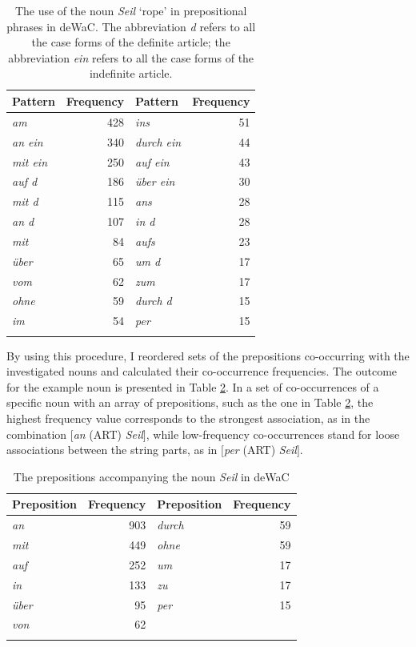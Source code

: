 \begin{table}
		\begin{tabular}{lr lr}
		\lsptoprule
		Pattern & Frequency &  Pattern & Frequency\\\midrule
			\textit{am} & 428 & \textit{ins} & 51\\
			\textit{an ein} & 340 & \textit{durch ein} & 44\\
			\textit{mit ein} & 250 & \textit{auf ein} & 43\\
			\textit{auf d} & 186 & \textit{über ein} & 30\\
			\textit{mit d} & 115 & \textit{ans} & 28\\
			\textit{an d} & 107 & \textit{in d} & 28\\
			\textit{mit} & 84 & \textit{aufs} & 23\\
			\textit{über} & 65 & \textit{um d} & 17\\
			\textit{vom} & 62 & \textit{zum} & 17\\
			\textit{ohne} & 59 & \textit{durch d} & 15\\
			\textit{im} & 54 & \textit{per} & 15\\
		\lspbottomrule
	\end{tabular}
	\caption{The use of the noun \textit{Seil} `rope' in prepositional phrases in deWaC. The abbreviation \textit{d} refers to all the case forms of the definite article; the abbreviation \textit{ein} refers to all the case forms of the indefinite article.\label{tab:5:2}}
\end{table}

By using this procedure, I reordered sets of the prepositions co-occurring with the investigated nouns and calculated their co-occurrence frequencies. The outcome for the example noun is presented in Table \ref{tab:5:3}. In a set of co-occurrences of a specific noun with an array of prepositions, such as the one in Table \ref{tab:5:3}, the highest frequency value corresponds to the strongest association, as in the combination $[$\textit{an} (ART) \textit{Seil}$]$, while low-frequency co-occurrences stand for loose associations between the string parts, as in $[$\textit{per} (ART) \textit{Seil}$]$.

\begin{table}
		\begin{tabular}{lr lr}
		\lsptoprule
		Preposition & Frequency & Preposition & Frequency\\\midrule
	\textit{an} & 903 & \textit{durch} & 59\\
	\textit{mit} & 449 & \textit{ohne} & 59\\
	\textit{auf} & 252 & \textit{um} & 17\\
	\textit{in} & 133 & \textit{zu} & 17\\
	\textit{über} & 95 & \textit{per} & 15\\
	\textit{von} & 62 & & \\
		\lspbottomrule
	\end{tabular}
	\caption{The prepositions accompanying the noun \textit{Seil} in deWaC\label{tab:5:3}}
\end{table}


